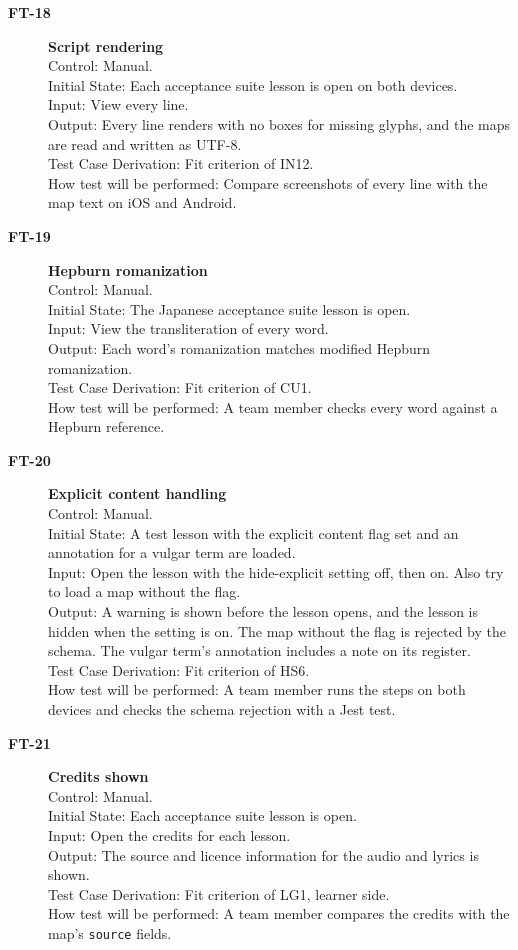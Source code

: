 \documentclass[12pt, titlepage]{article}
\newcommand{\tid}[1]{\hypertarget{test:#1}{\textbf{#1}}}
\begin{document}
\begin{description}
\item[\tid{FT-18}] \textbf{Script rendering}\\
Control: Manual.\\
Initial State: Each acceptance suite lesson is open on both devices.\\
Input: View every line.\\
Output: Every line renders with no boxes for missing glyphs, and the maps are
read and written as UTF-8.\\
Test Case Derivation: Fit criterion of IN12.\\
How test will be performed: Compare screenshots of every line with the map text
on iOS and Android.

\item[\tid{FT-19}] \textbf{Hepburn romanization}\\
Control: Manual.\\
Initial State: The Japanese acceptance suite lesson is open.\\
Input: View the transliteration of every word.\\
Output: Each word's romanization matches modified Hepburn romanization.\\
Test Case Derivation: Fit criterion of CU1.\\
How test will be performed: A team member checks every word against a Hepburn
reference.

\item[\tid{FT-20}] \textbf{Explicit content handling}\\
Control: Manual.\\
Initial State: A test lesson with the explicit content flag set and an annotation
for a vulgar term are loaded.\\
Input: Open the lesson with the hide-explicit setting off, then on. Also try to
load a map without the flag.\\
Output: A warning is shown before the lesson opens, and the lesson is hidden
when the setting is on. The map without the flag is rejected by the schema. The
vulgar term's annotation includes a note on its register.\\
Test Case Derivation: Fit criterion of HS6.\\
How test will be performed: A team member runs the steps on both devices and
checks the schema rejection with a Jest test.

\item[\tid{FT-21}] \textbf{Credits shown}\\
Control: Manual.\\
Initial State: Each acceptance suite lesson is open.\\
Input: Open the credits for each lesson.\\
Output: The source and licence information for the audio and lyrics is shown.\\
Test Case Derivation: Fit criterion of LG1, learner side.\\
How test will be performed: A team member compares the credits with the map's
\texttt{source} fields.


\end{description}
\end{document}
